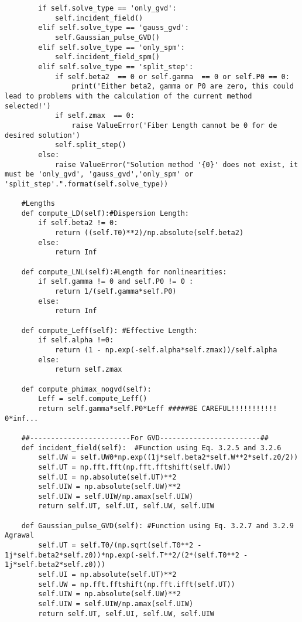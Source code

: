 \begin{verbatim}
        if self.solve_type == 'only_gvd':
            self.incident_field()
        elif self.solve_type == 'gauss_gvd':
            self.Gaussian_pulse_GVD()
        elif self.solve_type == 'only_spm':
            self.incident_field_spm()
        elif self.solve_type == 'split_step':
            if self.beta2  == 0 or self.gamma  == 0 or self.P0 == 0:
                print('Either beta2, gamma or P0 are zero, this could lead to problems with the calculation of the current method selected!')
            if self.zmax  == 0:
                raise ValueError('Fiber Length cannot be 0 for de desired solution')       
            self.split_step()
        else:
            raise ValueError("Solution method '{0}' does not exist, it must be 'only_gvd', 'gauss_gvd','only_spm' or 'split_step'.".format(self.solve_type))

    #Lengths
    def compute_LD(self):#Dispersion Length:
        if self.beta2 != 0:
            return ((self.T0)**2)/np.absolute(self.beta2)
        else:
            return Inf 

    def compute_LNL(self):#Length for nonlinearities:
        if self.gamma != 0 and self.P0 != 0 :
            return 1/(self.gamma*self.P0)
        else:
            return Inf 

    def compute_Leff(self): #Effective Length:
        if self.alpha !=0:
            return (1 - np.exp(-self.alpha*self.zmax))/self.alpha
        else: 
            return self.zmax 

    def compute_phimax_nogvd(self):
        Leff = self.compute_Leff()
        return self.gamma*self.P0*Leff #####BE CAREFUL!!!!!!!!!!! 0*inf...

    ##------------------------For GVD------------------------##
    def incident_field(self):  #Function using Eq. 3.2.5 and 3.2.6
        self.UW = self.UW0*np.exp((1j*self.beta2*self.W**2*self.z0/2))
        self.UT = np.fft.fft(np.fft.fftshift(self.UW))
        self.UI = np.absolute(self.UT)**2
        self.UIW = np.absolute(self.UW)**2
        self.UIW = self.UIW/np.amax(self.UIW) 
        return self.UT, self.UI, self.UW, self.UIW

    def Gaussian_pulse_GVD(self): #Function using Eq. 3.2.7 and 3.2.9 Agrawal
        self.UT = self.T0/(np.sqrt(self.T0**2 - 1j*self.beta2*self.z0))*np.exp(-self.T**2/(2*(self.T0**2 - 1j*self.beta2*self.z0)))
        self.UI = np.absolute(self.UT)**2
        self.UW = np.fft.fftshift(np.fft.ifft(self.UT))
        self.UIW = np.absolute(self.UW)**2
        self.UIW = self.UIW/np.amax(self.UIW) 
        return self.UT, self.UI, self.UW, self.UIW



\end{verbatim}
